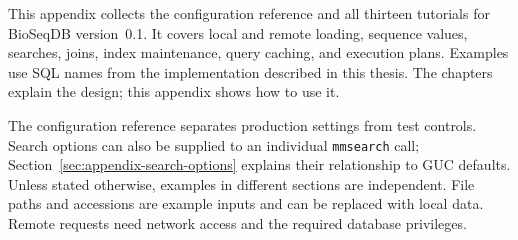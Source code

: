 \normalfont
{}
\raggedbottom
\setlength{\emergencystretch}{2em}

This appendix collects the configuration reference and all thirteen tutorials
for BioSeqDB version~0.1. It covers local and remote loading, sequence values,
searches, joins, index maintenance, query caching, and execution plans.
Examples use SQL names from the implementation described in this thesis.
The chapters explain the design; this appendix shows how to use it.

The configuration reference separates production settings from test controls.
Search options can also be supplied to an individual \texttt{mmsearch} call;
Section~\ref{sec:appendix-search-options} explains their relationship to GUC
defaults. Unless stated otherwise, examples in different sections are
independent.
File paths and accessions are example inputs and can be replaced with local
data. Remote requests need network access and the required database privileges.












\label{sec:appendix-reference-end}
\flushbottom
